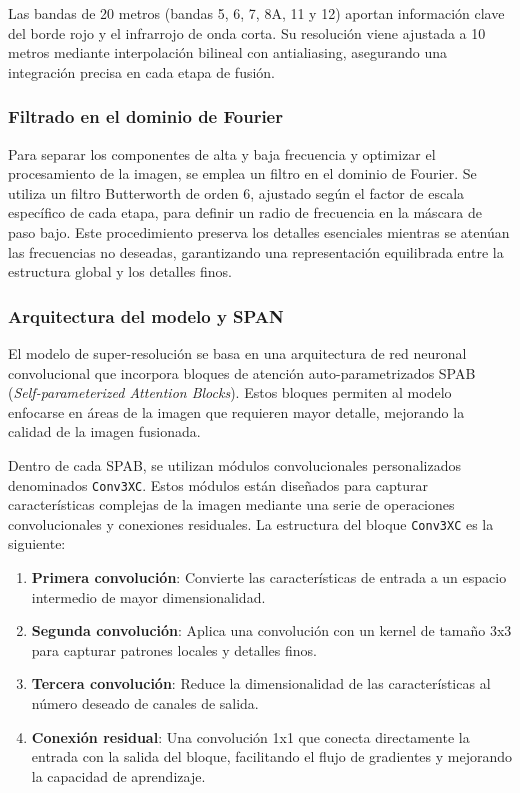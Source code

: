                 Las bandas de 20 metros (bandas 5, 6, 7, 8A, 11 y 12) aportan información clave del borde rojo y el infrarrojo de onda corta. Su resolución viene ajustada a 10 metros mediante interpolación bilineal con antialiasing, asegurando una integración precisa en cada etapa de fusión.

        \subsubsection{Filtrado en el dominio de Fourier}

            Para separar los componentes de alta y baja frecuencia y optimizar el procesamiento de la imagen, se emplea un filtro en el dominio de Fourier. Se utiliza un filtro Butterworth de orden 6, ajustado según el factor de escala específico de cada etapa, para definir un radio de frecuencia en la máscara de paso bajo. Este procedimiento preserva los detalles esenciales mientras se atenúan las frecuencias no deseadas, garantizando una representación equilibrada entre la estructura global y los detalles finos.

        \subsubsection{Arquitectura del modelo y SPAN}

            El modelo de super-resolución se basa en una arquitectura de red neuronal convolucional que incorpora bloques de atención auto-parametrizados SPAB (\textit{Self-parameterized Attention Blocks}). Estos bloques permiten al modelo enfocarse en áreas de la imagen que requieren mayor detalle, mejorando la calidad de la imagen fusionada.

            Dentro de cada SPAB, se utilizan módulos convolucionales personalizados denominados \texttt{Conv3XC}. Estos módulos están diseñados para capturar características complejas de la imagen mediante una serie de operaciones convolucionales y conexiones residuales. La estructura del bloque \texttt{Conv3XC} es la siguiente:

            \begin{enumerate}
                \item \textbf{Primera convolución}: Convierte las características de entrada a un espacio intermedio de mayor dimensionalidad.
                \item \textbf{Segunda convolución}: Aplica una convolución con un kernel de tamaño 3x3 para capturar patrones locales y detalles finos.
                \item \textbf{Tercera convolución}: Reduce la dimensionalidad de las características al número deseado de canales de salida.
                \item \textbf{Conexión residual}: Una convolución 1x1 que conecta directamente la entrada con la salida del bloque, facilitando el flujo de gradientes y mejorando la capacidad de aprendizaje.
            \end{enumerate}

